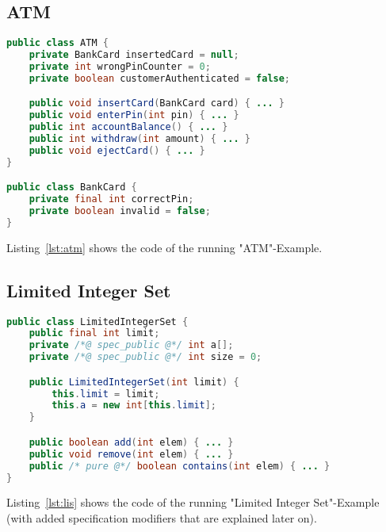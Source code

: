		\subsection{ATM}
			\begin{lstlisting}[caption = { Running Example for JML 1 }, label = lst:atm, language = Java]
public class ATM {
	private BankCard insertedCard = null;
	private int wrongPinCounter = 0;
	private boolean customerAuthenticated = false;

	public void insertCard(BankCard card) { ... }
	public void enterPin(int pin) { ... }
	public int accountBalance() { ... }
	public int withdraw(int amount) { ... }
	public void ejectCard() { ... }
}

public class BankCard {
	private final int correctPin;
	private boolean invalid = false;
}
			\end{lstlisting}

			Listing~\ref{lst:atm} shows the code of the running "ATM"-Example.

		\subsection{Limited Integer Set}
			\begin{lstlisting}[caption = { Running Example for JML 2 }, label = lst:lis, language = Java]
public class LimitedIntegerSet {
	public final int limit;
	private /*@ spec_public @*/ int a[];
	private /*@ spec_public @*/ int size = 0;

	public LimitedIntegerSet(int limit) {
		this.limit = limit;
		this.a = new int[this.limit];
	}

	public boolean add(int elem) { ... }
	public void remove(int elem) { ... }
	public /* pure @*/ boolean contains(int elem) { ... }
}
			\end{lstlisting}

			Listing~\ref{lst:lis} shows the code of the running "Limited Integer Set"-Example (with added specification modifiers that are explained later on).

